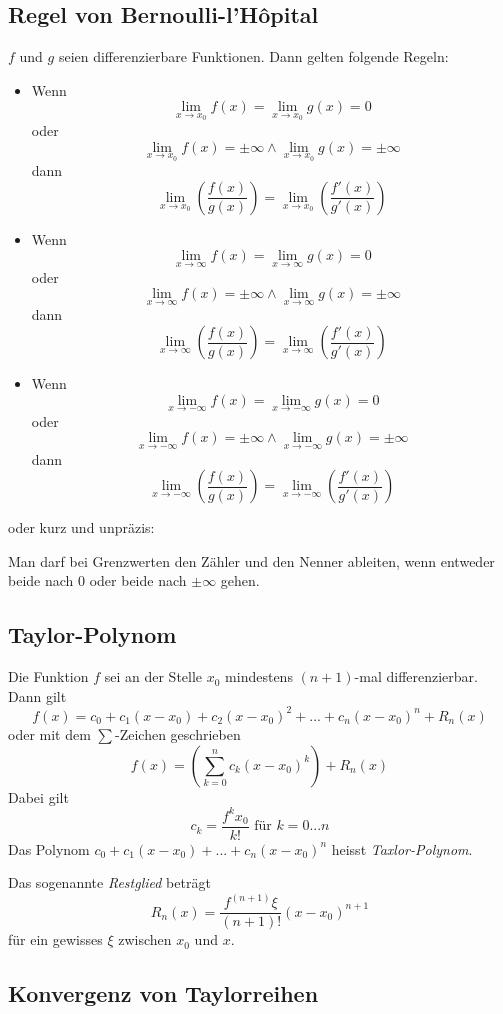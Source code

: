 \documentclass[10pt,a4paper]{article}
\begin{document}
\subsection{Regel von Bernoulli-l'Hôpital}

$f$ und $g$ seien differenzierbare Funktionen. Dann gelten folgende Regeln:

\begin{itemize}
	\item Wenn
	$$\lim_{x \to x_0}f(x) = \lim_{x \to x_0}g(x) = 0$$
	oder $$\lim_{x \to x_0}f(x) = \pm \infty \wedge \lim_{x \to x_0}g(x) = \pm \infty$$
	dann $$\lim_{x \to x_0}\left(\frac{f(x)}{g(x)}\right) = \lim_{x \to x_0}\left(\frac{f'(x)}{g'(x)}\right)$$
	\item Wenn
	$$\lim_{x \to \infty}f(x) = \lim_{x \to \infty}g(x) = 0$$
	oder $$\lim_{x \to \infty}f(x) = \pm \infty \wedge \lim_{x \to \infty}g(x) = \pm \infty$$
	dann $$\lim_{x \to \infty}\left(\frac{f(x)}{g(x)}\right) = \lim_{x \to \infty}\left(\frac{f'(x)}{g'(x)}\right)$$
	\item Wenn
	$$\lim_{x \to -\infty}f(x) = \lim_{x \to -\infty}g(x) = 0$$
	oder $$\lim_{x \to -\infty}f(x) = \pm \infty \wedge \lim_{x \to -\infty}g(x) = \pm \infty$$
	dann $$\lim_{x \to -\infty}\left(\frac{f(x)}{g(x)}\right) = \lim_{x \to -\infty}\left(\frac{f'(x)}{g'(x)}\right)$$
\end{itemize}
oder kurz und unpräzis:

Man darf bei Grenzwerten den Zähler und den Nenner ableiten, wenn entweder beide nach $0$ oder beide nach $\pm \infty$ gehen.


\subsection{Taylor-Polynom}

Die Funktion $f$ sei an der Stelle $x_0$ mindestens $(n + 1)$-mal differenzierbar. Dann gilt
$$f(x) = c_0 + c_1(x-x_0) + c_2(x-x_0)^2 + ... + c_n(x-x_0)^n + R_n(x)$$
oder mit dem $\sum$-Zeichen geschrieben
$$f(x) = \left(\sum_{k=0}^n c_k(x-x_0)^k\right) + R_n(x)$$
Dabei gilt
$$c_k = \frac{f^kx_0}{k!}\textrm{ für }k=0...n$$
Das Polynom $c_0 + c_1(x-x_0)+...+c_n(x-x_0)^n$ heisst \textit{Taxlor-Polynom}.

Das sogenannte \textit{Restglied} beträgt
$$R_n(x) = \frac{f^{(n+1)}\xi}{(n+1)!}(x-x_0)^{n+1}$$
für ein gewisses $\xi$ zwischen $x_0$ und $x$.


\subsection{Konvergenz von Taylorreihen}
\end{document}
